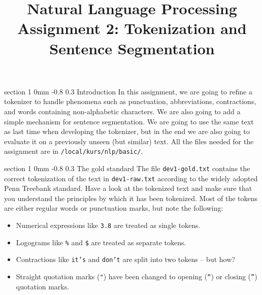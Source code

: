 \documentclass[11pt]{article}
\title{{\LARGE Natural Language Processing}\\[1.5mm]{\large Assignment 2: Tokenization and Sentence Segmentation}}
\author{}
\date{} %
\makeatletter
\newcommand{\newsec}[2]{\section{#1}\label{sec:#2}\noindent}
\renewcommand{\section}{\@startsection
{section}%
{1}%
{0mm}%
{-0.8\baselineskip}%
{0.3\baselineskip}%
{\bfseries\large}}%
\makeatother
\begin{document}
 

\maketitle
\vspace{-2mm}
\newsec{Introduction}{intro}%
In this assignment, we are going to refine a tokenizer to handle phenomena such as punctuation, abbreviations, contractions, and words containing non-alphabetic characters.
We are also going to add a simple mechanism for sentence segmentation. We are going to use the same text as last time when developing the tokenizer, but in the end we
are also going to evaluate it on a previously unseen (but similar) text. All the files needed for the assignment are in {\tt /local/kurs/nlp/basic/}.

\newsec{The gold standard}{gold}%
The file {\tt dev1-gold.txt} contains the correct tokenization of the text in {\tt dev1-raw.txt} according to the widely adopted Penn Treebank standard. 
Have a look at the tokenized text and make sure that you understand the principles
by which it has been tokenized. Most of the tokens are either regular words or punctuation marks, but note the following:
\begin{itemize}[noitemsep,topsep=0.2cm]
\item Numerical expressions like {\tt 3.8} are treated as single tokens.
\item Logograms like {\tt \%} and {\tt \$} are treated as separate tokens.
\item Contractions like {\tt it's} and {\tt don't} are split into two tokens -- but how? 
\item Straight quotation marks ({\tt "}) have been changed to opening ({\tt ``}) or closing ({\tt ''}) quotation marks.
\end{itemize}
\end{document}
